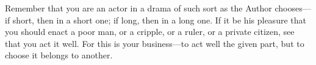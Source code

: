 Remember  that  you are  an  actor  in  a drama  of  such  sort as  the  Author
chooses---if short, then in a short one; if  long, then in a long one. If it be
his pleasure that you  should enact a poor man, or a cripple,  or a ruler, or a
private citizen, see that  you act it well. For this  is your business---to act
well the given part, but to choose it belongs to another.
